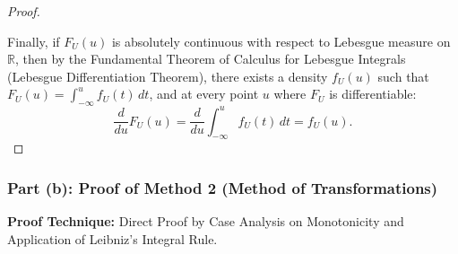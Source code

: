 \documentclass[11pt, letterpaper]{article}
\theoremstyle{definition}
\theoremstyle{remark}
\newcommand{\R}{\mathbb{R}}
\begin{document}
\begin{proof}
\begin{enumerate}[label=\textbf{Axiom \arabic*:}]
\end{enumerate}
Finally, if $F_U(u)$ is absolutely continuous with respect to Lebesgue measure on $\R$, then by the Fundamental Theorem of Calculus for Lebesgue Integrals (Lebesgue Differentiation Theorem), there exists a density $f_U(u)$ such that $F_U(u) = \int_{-\infty}^u f_U(t) \, dt$, and at every point $u$ where $F_U$ is differentiable:
\[
    \frac{d}{du} F_U(u) = \frac{d}{du} \int_{-\infty}^u f_U(t) \, dt = f_U(u).
\]
\end{proof}

\subsubsection*{Part (b): Proof of Method 2 (Method of Transformations)}
\textbf{Proof Technique:} Direct Proof by Case Analysis on Monotonicity and Application of Leibniz's Integral Rule.
\end{document}
